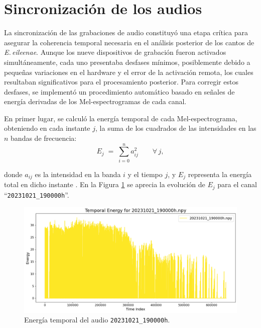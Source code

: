 \section{Sincronización de los audios}
\label{sec:sincronizacion}


La sincronización de las grabaciones de audio constituyó una 
etapa crítica para asegurar la coherencia temporal necesaria en 
el análisis posterior de los cantos de \emph{E.\,eileenae}. 
Aunque los nueve dispositivos de grabación fueron activados 
simultáneamente, cada uno presentaba desfases mínimos, posiblemente 
debido a pequeñas variaciones en el hardware y el error de 
la activación remota, los cuales 
resultaban significativos para el procesamiento posterior. 
Para corregir estos 
desfases, se implementó un procedimiento automático basado en 
señales de energía derivadas de los Mel-espectrogramas de cada 
canal.

En primer lugar, se calculó la energía temporal de cada 
Mel-espectrograma, obteniendo en cada instante \(j\), la suma 
de los cuadrados de las intensidades en las \(n\) bandas de 
frecuencia:
\begin{equation}
    \label{energyformula}
    E_j \;=\; \sum_{i=0}^{n} a_{ij}^2 
    \qquad\forall\,j,
\end{equation}

donde \(a_{ij}\) es la intensidad en la banda \(i\) y el tiempo 
\(j\), y \(E_j\) representa la energía total en dicho instante 
\cite{jurafskyspeech}. 
En la Figura \ref{fig:energy} se aprecia la evolución de 
\(E_j\) para el canal “\texttt{20231021\_190000h}”.



\begin{figure}[ht]
    \centering
    \includegraphics[width=0.9\linewidth]{Graphics/temp_energy.png}
    \caption{Energía temporal del audio \texttt{20231021\_190000h}.}
    \label{fig:energy}
  \end{figure}

